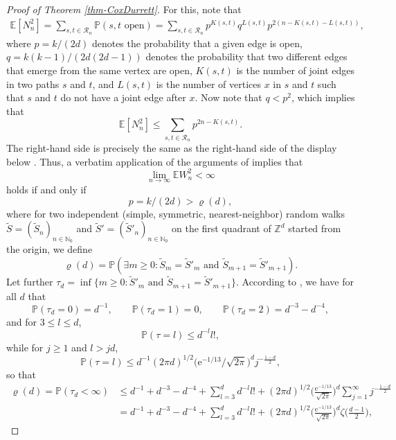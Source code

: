 \documentclass[a4paper, oneside, 11pt]{amsart}
\newcommand{\e}{\mathrm e}
\newcommand{\N}{\mathbb{N}}
\theoremstyle{definition}
\renewcommand{\P}{\mathbb{P}}
\newcommand{\1}{\mathbbm{1}}
\newcommand{\E}{\mathbb{E}}
\newcommand{\0}{\mathbf{o}}
\newcommand{\Z}{\mathbb{Z}}
\numberwithin{equation}{section}
\begin{document}
\begin{proof}[Proof of Theorem \ref{thm-CoxDurrett}]
For this, note that 
\begin{align*}
\E[N_n^2]=\sum_{s,t\in \mathcal R_n}\P(s,t\text{ open})=\sum_{s,t\in \mathcal R_n}p^{K(s,t)}q^{L(s,t)}p^{2(n-K(s,t)-L(s,t))},
\end{align*}
where $p=k/(2d)$ denotes the probability that a given edge is open, $q=k(k-1)/(2d(2d-1))$ denotes the probability that two different edges that emerge from the same vertex are open, $K(s,t)$ is the number of joint edges in two paths $s$ and $t$, and $L(s,t)$ is the number of vertices $x$ in $s$ and $t$ such that $s$ and $t$ do not have a joint edge after $x$.  Now note that $q<p^2$, which implies that
\[ \E[N_n^2] \leq \sum_{s,t\in \mathcal R_n} p^{2n-K(s,t)}. \]
The right-hand side is precisely the same as the right-hand side of the display below \cite[Equation~(2$\cdot$7)]{CoxDurrett}. Thus, a verbatim application of the arguments of \cite[Section 2]{CoxDurrett} implies that 
\[ \lim_{n\to\infty} \E W_n^2 <\infty \]
holds if and only if 
\[ p =k/(2d)> \varrho(d), \]
where for two independent (simple, symmetric, nearest-neighbor) random walks $\widetilde S=(\widetilde S_n)_{n\in\N_0}$ and $\widetilde S'=(\widetilde S'_n)_{n\in\N_0}$ on the first quadrant of $\Z^d$ started from the origin, we define
\[ \varrho(d) = \P(\exists m\geq 0 \colon \widetilde S_m = \widetilde S'_m \text{ and } \widetilde S_{m+1} = \widetilde S'_{m+1}). \]
Let further $\tau_d=\inf \{ m \geq 0 \colon \widetilde S'_m \text{ and } \widetilde S_{m+1} = \widetilde S'_{m+1} \}$.
According to \cite[p.~155]{CoxDurrett}, we have for all $d$ that
\begin{equation}\label{firstfew} 
    \P(\tau_d=0)=d^{-1}, \qquad \P(\tau_d=1)=0, \qquad \P(\tau_d=2)=d^{-3}-d^{-4}, 
\end{equation}
and for $3 \leq l \leq d$,
\[ \P(\tau=l) \leq d^{-l} l!, \]
while for $j\geq 1$ and $l >jd$,
\begin{equation}\label{bigl} 
    \P(\tau=l) \leq d^{-1} (2\pi d)^{1/2} \Big( \e^{-1/13}/\sqrt{2\pi} \Big)^d j^{-\frac{1-d}{2}},
\end{equation}
so that
\begin{equation}\label{CDUB} 
    \begin{aligned} 
        \varrho(d)=\P(\tau_d<\infty) 
        &\leq 
        d^{-1} + d^{-3} -d^{-4} + \sum_{l=3}^d d^{-l} l! +  (2\pi d)^{1/2} \Big( \frac{\e^{-1/13}}{\sqrt{2\pi}} \Big)^d \sum_{j=1}^{\infty} j^{-\frac{1-d}{2}} 
        \\ 
        & =
        d^{-1} + d^{-3} -d^{-4} + \sum_{l=3}^d d^{-l} l! +  (2\pi d)^{1/2} \Big( \frac{\e^{-1/13}}{\sqrt{2\pi}} \Big)^d \zeta\Big( \frac{d-1}{2} \Big), 

\end{aligned}
\end{equation}
\end{proof}
\end{document}
